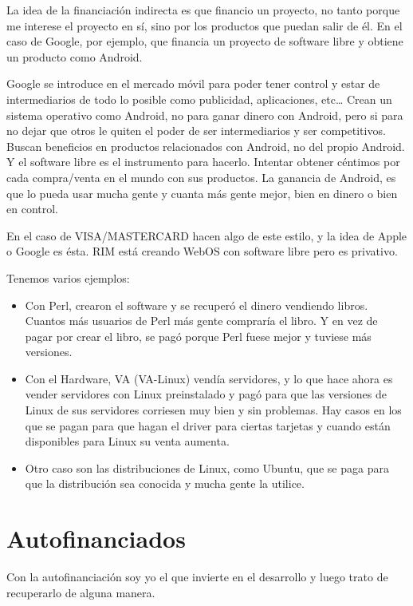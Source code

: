 La idea de la financiación indirecta es que financio un proyecto, no tanto
porque me interese el proyecto en sí, sino por los productos que puedan salir de
él. En el caso de Google, por ejemplo, que financia un proyecto de software
libre y obtiene un producto como Android.

Google se introduce en el mercado móvil para poder tener control y estar de
intermediarios de todo lo posible como publicidad, aplicaciones, etc\ldots
Crean un sistema operativo como Android, no para ganar dinero con Android, pero
si para no dejar que otros le quiten el poder de ser intermediarios y ser competitivos.
Buscan beneficios en productos relacionados con Android, no del propio Android.
Y el software libre es el instrumento para hacerlo. Intentar obtener céntimos
por cada compra/venta en el mundo con sus productos. La ganancia de Android, es
que lo pueda usar mucha gente y cuanta más gente mejor, bien en dinero o bien en
control.

En el caso de VISA/MASTERCARD hacen algo de este estilo, y la idea de Apple o
Google es ésta. RIM está creando WebOS con software libre pero es privativo.

Tenemos varios ejemplos:
\begin{itemize}
  \item Con Perl, crearon el software y se recuperó el dinero vendiendo libros.
  Cuantos más usuarios de Perl más gente compraría el libro. Y en vez de
  pagar por crear el libro, se pagó porque Perl fuese mejor y tuviese más
  versiones.
  \item Con el Hardware, VA (VA-Linux) vendía servidores, y lo que hace ahora es vender
servidores con Linux preinstalado y pagó para que las versiones de Linux
de sus servidores corriesen muy bien y sin problemas. Hay casos en los que se
pagan para que hagan el driver para ciertas tarjetas y cuando están disponibles
para Linux su venta aumenta.
\item Otro caso son las distribuciones de Linux, como Ubuntu, que se paga para
que la distribución sea conocida y mucha gente la utilice.
\end{itemize}



\section{Autofinanciados}

Con la autofinanciación soy yo el que invierte en el desarrollo y luego
trato de recuperarlo de alguna manera.

